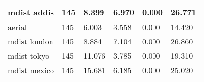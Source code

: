 \begin{table}[htbp]
\begin{tabular}{|l|l|l|l|l|l|}
mdist addis &       145 &     8.399 &     6.970 &     0.000 &    26.771 \\ \hline 
aerial &       145 &     6.003 &     3.558 &     0.000 &    14.420 \\ \hline 
mdist london &       145 &     8.884 &     7.104 &     0.000 &    26.860 \\ \hline 
mdist tokyo &       145 &    11.076 &     3.785 &     0.000 &    19.310 \\ \hline 
mdist mexico &       145 &    15.681 &     6.185 &     0.000 &    25.020 \\ \hline 
  \end{tabular}
\end{table}
